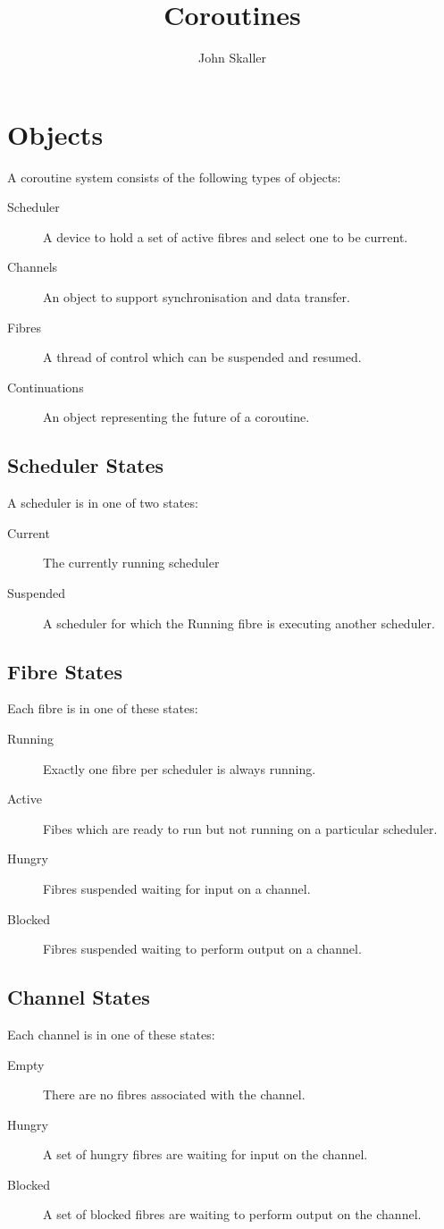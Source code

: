 \documentclass{article}
\title{Coroutines}
\author{John Skaller}
\begin{document}
\maketitle
\section{Objects}
A coroutine system consists of the following types of objects:
\begin{description}
\item[Scheduler] A device to hold a set of active fibres and
select one to be current.
\item[Channels] An object to support synchronisation and data transfer.
\item[Fibres] A thread of control which can be suspended and resumed.
\item[Continuations] An object representing the future of a coroutine.
\end{description}

\subsection{Scheduler States}
A scheduler is in one of two states:
\begin{description}
\item[Current] The currently running scheduler
\item[Suspended] A scheduler for which the Running fibre is
executing another scheduler.
\end{description}

\subsection{Fibre States}
Each fibre is in one of these states:
\begin{description}
\item[Running] Exactly one fibre per scheduler is always running.
\item[Active] Fibes which are ready to run but not running on a particular scheduler.
\item[Hungry] Fibres suspended waiting for input on a channel.
\item[Blocked] Fibres suspended waiting to perform output on a channel.
\end{description}

\subsection{Channel States}
Each channel is in one of these states:
\begin{description}
\item[Empty] There are no fibres associated with the channel.
\item[Hungry] A set of hungry fibres are waiting for input on the channel.
\item[Blocked] A set of blocked fibres are waiting to perform output on the channel.
\end{description}
\end{document}
